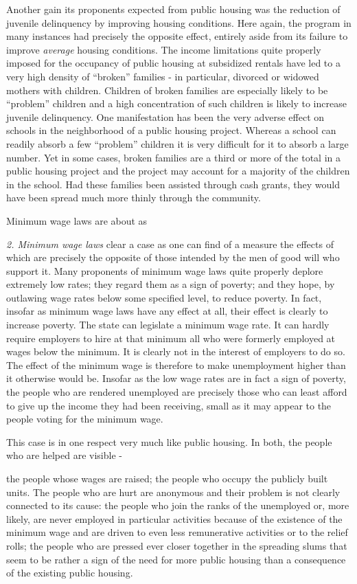 \documentclass[11pt,openany]{book}
\begin{document}
Another gain its proponents expected from public housing was the reduction of juvenile delinquency by improving housing conditions. Here again, the program in many instances had precisely the opposite effect, entirely aside from its failure to improve \emph{average} housing conditions. The income limitations quite properly imposed for the occupancy of public housing at subsidized rentals have led to a very high density of ``broken'' families - in particular, divorced or widowed mothers with children. Children of broken families are especially likely to be ``problem'' children and a high concentration of such children is likely to increase juvenile delinquency. One manifestation has been the very adverse effect on schools in the neighborhood of a public housing project. Whereas a school can readily absorb a few ``problem'' children it is very difficult for it to absorb a large number. Yet in some cases, broken families are a third or more of the total in a public housing project and the project may account for a majority of the children in the school. Had these families been assisted through cash grants, they would have been spread much more thinly through the community.

Minimum wage laws are about as

\emph{2. Minimum wage laws} clear a case as one can find of a measure the effects of which are precisely the opposite of those intended by the men of good will who support it. Many proponents of minimum wage laws quite properly deplore extremely low rates; they regard them as a sign of poverty; and they hope, by outlawing wage rates below some specified level, to reduce poverty. In fact, insofar as minimum wage laws have any effect at all, their effect is clearly to increase poverty. The state can legislate a minimum wage rate. It can hardly require employers to hire at that minimum all who were formerly employed at wages below the minimum. It is clearly not in the interest of employers to do so. The effect of the minimum wage is therefore to make unemployment higher than it otherwise would be. Insofar as the low wage rates are in fact a sign of poverty, the people who are rendered unemployed are precisely those who can least afford to give up the income they had been receiving, small as it may appear to the people voting for the minimum wage.

This case is in one respect very much like public housing. In both, the people who are helped are visible -

the people whose wages are raised; the people who occupy the publicly built units. The people who are hurt are anonymous and their problem is not clearly connected to its cause: the people who join the ranks of the unemployed or, more likely, are never employed in particular activities because of the existence of the minimum wage and are driven to even less remunerative activities or to the relief rolls; the people who are pressed ever closer together in the spreading slums that seem to be rather a sign of the need for more public housing than a consequence of the existing public housing.
\end{document}
